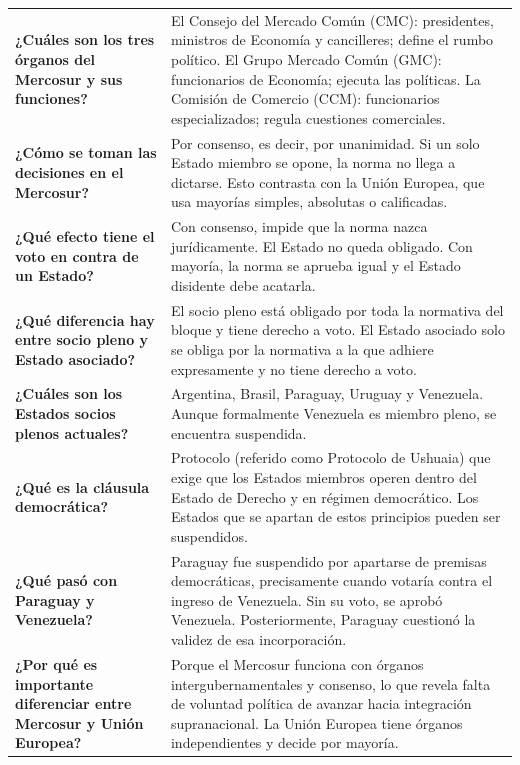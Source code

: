 \documentclass[12pt,oneside]{book}
\begin{document}
\begin{table}[H]
\begin{tabularx}{\textwidth}{
    >{\raggedright\arraybackslash}p{}
    >{\raggedright\arraybackslash}X
}
\textbf{¿Cuáles son los tres órganos del Mercosur y sus funciones?} &
El Consejo del Mercado Común (CMC): presidentes, ministros de Economía y cancilleres; define el rumbo político. El Grupo Mercado Común (GMC): funcionarios de Economía; ejecuta las políticas. La Comisión de Comercio (CCM): funcionarios especializados; regula cuestiones comerciales. \\

\textbf{¿Cómo se toman las decisiones en el Mercosur?} &
Por consenso, es decir, por unanimidad. Si un solo Estado miembro se opone, la norma no llega a dictarse. Esto contrasta con la Unión Europea, que usa mayorías simples, absolutas o calificadas. \\

\textbf{¿Qué efecto tiene el voto en contra de un Estado?} &
Con consenso, impide que la norma nazca jurídicamente. El Estado no queda obligado. Con mayoría, la norma se aprueba igual y el Estado disidente debe acatarla. \\

\textbf{¿Qué diferencia hay entre socio pleno y Estado asociado?} &
El socio pleno está obligado por toda la normativa del bloque y tiene derecho a voto. El Estado asociado solo se obliga por la normativa a la que adhiere expresamente y no tiene derecho a voto. \\

\textbf{¿Cuáles son los Estados socios plenos actuales?} &
Argentina, Brasil, Paraguay, Uruguay y Venezuela. Aunque formalmente Venezuela es miembro pleno, se encuentra suspendida. \\

\textbf{¿Qué es la cláusula democrática?} &
Protocolo (referido como Protocolo de Ushuaia) que exige que los Estados miembros operen dentro del Estado de Derecho y en régimen democrático. Los Estados que se apartan de estos principios pueden ser suspendidos. \\

\textbf{¿Qué pasó con Paraguay y Venezuela?} &
Paraguay fue suspendido por apartarse de premisas democráticas, precisamente cuando votaría contra el ingreso de Venezuela. Sin su voto, se aprobó Venezuela. Posteriormente, Paraguay cuestionó la validez de esa incorporación. \\

\textbf{¿Por qué es importante diferenciar entre Mercosur y Unión Europea?} &
Porque el Mercosur funciona con órganos intergubernamentales y consenso, lo que revela falta de voluntad política de avanzar hacia integración supranacional. La Unión Europea tiene órganos independientes y decide por mayoría. \\


\end{tabularx}
\end{table}
\end{document}
